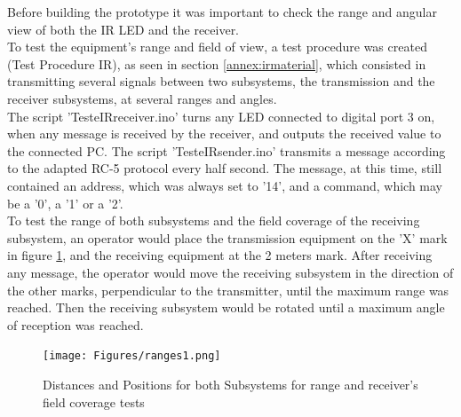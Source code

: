 Before building the prototype it was important to check the range and angular view of both the IR LED and the receiver.\\
To test the equipment's range and field of view, a test procedure was created (Test Procedure IR), as seen in section \ref{annex:irmaterial}, which consisted in transmitting several signals between two subsystems, the transmission and the receiver subsystems, at several ranges and angles.\\

The script 'TesteIRreceiver.ino' turns any LED connected to digital port 3 on, when any message is received by the receiver, and outputs the received value to the connected PC.
The script 'TesteIRsender.ino' transmits a message according to the adapted RC-5 protocol every half second. The message, at this time, still contained an address, which was always set to '14', and a command, which may be a '0', a '1' or a '2'.\\
To test the range of both subsystems and the field coverage of the receiving subsystem, an operator would place the transmission equipment on the 'X' mark in figure \ref{fig:ranges1}, and the receiving equipment at the 2 meters mark. After receiving any message, the operator would move the receiving subsystem in the direction of the other marks, perpendicular to the transmitter, until the maximum range was reached. Then the receiving subsystem would be rotated until a maximum angle of reception was reached.\\
\begin{figure}[!htb]
  \centering
  \texttt{[image: Figures/ranges1.png]}
  \caption[Distances and Positions for both Subsystems for test procedure 1]{Distances and Positions for both Subsystems for range and receiver's field coverage tests}
  \label{fig:ranges1}
\end{figure}

